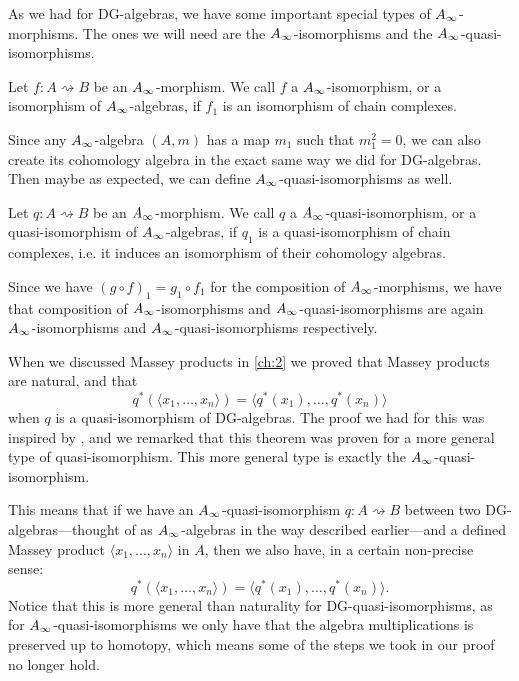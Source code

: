 As we had for DG-algebras, we have some important special types of $\A$-morphisms. The ones we will need are the $\A$-isomorphisms and the $\A$-quasi-isomorphisms.

\begin{definition}[$\A$-isomorphism]
\label{def:A_infinity-isomorphism}
Let $f\colon A\rightsquigarrow B$ be an $\A$-morphism. We call $f$ a $\A$-isomorphism, or a isomorphism of $\A$-algebras, if $f_1$ is an isomorphism of chain complexes.
\end{definition}

Since any $\A$-algebra $(A, m)$ has a map $m_1$ such that $m_1^2=0$, we can also create its cohomology algebra in the exact same way we did for DG-algebras. Then maybe as expected, we can define $\A$-quasi-isomorphisms as well.

\begin{definition}
\label{def:A_infinity-quasi-isomorphism}
Let $q\colon A\rightsquigarrow B$ be an $\A$-morphism. We call $q$ a $\A$-quasi-isomorphism, or a quasi-isomorphism of $\A$-algebras, if $q_1$ is a quasi-isomorphism of chain complexes, i.e. it induces an isomorphism of their cohomology algebras. 
\end{definition}

Since we have $(g\circ f)_1 = g_1\circ f_1$ for the composition of $\A$-morphisms, we have that composition of $\A$-isomorphisms and $\A$-quasi-isomorphisms are again $\A$-isomorphisms and $\A$-quasi-isomorphisms respectively.

\begin{remark}
When we discussed Massey products in \cref{ch:2} we proved that Massey products are natural, and that 
\begin{equation*}
	q^*(\langle x_1, \ldots, x_n\rangle ) = \langle q^*(x_1),\ldots, q^*(x_n)\rangle
\end{equation*}
when $q$ is a quasi-isomorphism of DG-algebras. The proof we had for this was inspired by \cite[Theorem 1.5]{naturality}, and we remarked that this theorem was proven for a more general type of quasi-isomorphism. This more general type is exactly the $\A$-quasi-isomorphism.

This means that if we have an $\A$-quasi-isomorphism $q\colon A\rightsquigarrow B$ between two DG-algebras---thought of as $\A$-algebras in the way described earlier---and a defined Massey product $\langle x_1, \ldots, x_n\rangle$ in $A$, then we also have, in a certain non-precise sense:
\begin{equation*}
	q^*(\langle x_1, \ldots, x_n\rangle ) = \langle q^*(x_1),\ldots, q^*(x_n)\rangle .
\end{equation*}
Notice that this is more general than naturality for DG-quasi-isomorphisms, as for $\A$-quasi-isomorphisms we only have that the algebra multiplications is preserved up to homotopy, which means some of the steps we took in our proof no longer hold. 
\end{remark}




